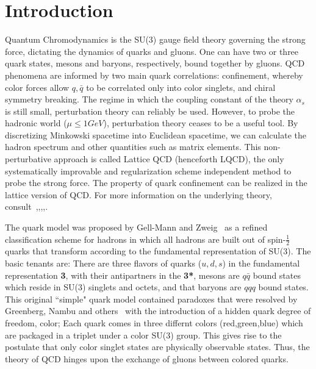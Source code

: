 
\chapter{Introduction}
\label{sec:intro}
\newcommand{\todo}[1]{\textbf{\color{red}TODO: #1}}

Quantum Chromodynamics is the SU(3) gauge field theory governing the strong force, dictating the dynamics of quarks and gluons. One can have two or three quark states, mesons and baryons, respectively, bound together by gluons. QCD phenomena are informed by two main quark correlations: confinement, whereby color forces allow $q,\bar{q}$ to be correlated only into color singlets, and chiral symmetry breaking. The regime in which the coupling constant of the theory $\alpha_s$ is still small, perturbation theory can reliably be used. However, to probe the hadronic world ($\mu \leq 1 GeV$), perturbation theory ceases to be a useful tool. By discretizing Minkowski spacetime into Euclidean spacetime, we can calculate the hadron spectrum and other quantities such as matrix elements. This non-perturbative approach is called Lattice QCD (henceforth LQCD), the only systematically improvable and regularization scheme independent method to probe the strong force. The property of quark confinement can be realized in the lattice version of QCD. For more information on the underlying theory, consult~\cite{10.5555/3029317},\cite{gupta1998introductionlatticeqcd},\cite{Gattringer2009QuantumCO},\cite{Griffiths:1987tj},\cite{Cheng1984GaugeTO}.

The quark model was proposed by Gell-Mann and Zweig~\cite{Gell-Mann:1964ewy}\cite{Zweig:1964ruk} as a refined classification scheme for hadrons in which all hadrons are built out of spin-$\frac{1}{2}$ quarks that transform according to the fundamental representation of SU(3). The basic tenants are: There are three flavors of quarks ($u,d,s$) in the fundamental representation \textbf{3}, with their antipartners in the \textbf{3*}, mesons are $q\bar{q}$ bound states which reside in SU(3) singlets and octets, and that baryons are $qqq$ bound states. This original ``simple" quark model contained paradoxes that were resolved by Greenberg, Nambu and others~\cite{Han:1965pf} with the introduction of a hidden quark degree of freedom, color; Each quark comes in three differnt colors (red,green,blue) which are packaged in a triplet under a color SU(3) group. This gives rise to the postulate that only color singlet states are physically observable states. Thus, the theory of QCD hinges upon the exchange of gluons between colored quarks.   

